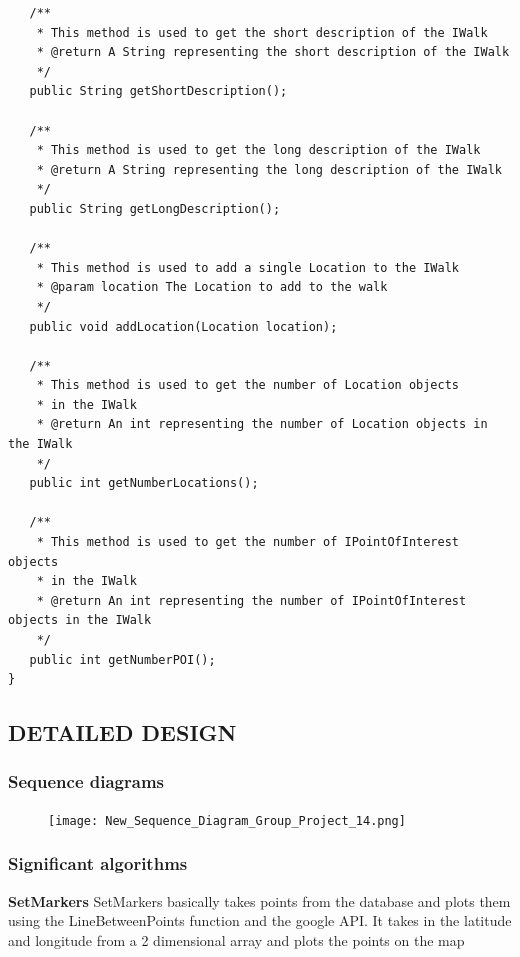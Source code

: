\documentclass{project}
\begin{document}
\begin{verbatim}
   /**
    * This method is used to get the short description of the IWalk
    * @return A String representing the short description of the IWalk
    */
   public String getShortDescription();
   
   /**
    * This method is used to get the long description of the IWalk
    * @return A String representing the long description of the IWalk
    */
   public String getLongDescription();
   
   /**
    * This method is used to add a single Location to the IWalk
    * @param location The Location to add to the walk
    */
   public void addLocation(Location location);
   
   /**
    * This method is used to get the number of Location objects
    * in the IWalk
    * @return An int representing the number of Location objects in the IWalk
    */
   public int getNumberLocations();
   
   /**
    * This method is used to get the number of IPointOfInterest objects
    * in the IWalk
    * @return An int representing the number of IPointOfInterest objects in the IWalk
    */
   public int getNumberPOI();
}

\end{verbatim}

\newpage

\subsection{DETAILED DESIGN}
\subsubsection{Sequence diagrams}

\begin{figure}[h] 

   
\texttt{[image: New\_Sequence\_Diagram\_Group\_Project\_14.png]}
    
\end{figure}

\newpage

\subsubsection{Significant algorithms}
\textbf{SetMarkers}
SetMarkers basically takes points from the database and plots them using the LineBetweenPoints function and the google API. It takes in the latitude and longitude from a 2 dimensional array and plots the points on the map
\end{document}
